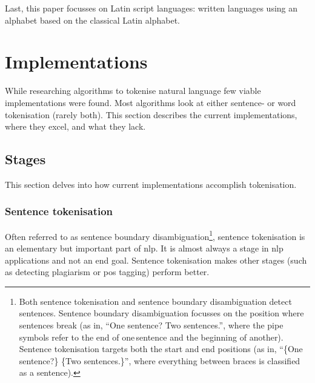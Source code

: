 Last, this paper focusses on Latin script languages: written languages
  using an alphabet based on the classical Latin alphabet.

\section{Implementations}\label{implementations}

While researching algorithms to tokenise natural language few viable
  implementations were found.
Most algorithms look at either sentence- or word tokenisation (rarely both).
This section describes the current implementations, where they excel, and
  what they lack.

\subsection{Stages}\label{stages}

This section delves into how current implementations accomplish tokenisation.

\subsubsection{Sentence tokenisation}\label{sentence-tokenisation}

Often referred to as sentence boundary disambiguation\footnote{Both
    sentence tokenisation and sentence boundary disambiguation detect
      sentences.
    Sentence boundary disambiguation focusses on the position where
      sentences break (as in, ``One sentence?\textbar{} Two
      sentences.\textbar{}'', where the pipe symbols refer to the end of
      one\,sentence and the beginning of another). Sentence
      tokenisation targets both the start and end positions (as in,
      ``\{One sentence?\} \{Two sentences.\}'', where everything between
      braces is classified as a sentence).}, sentence
  tokenisation is an elementary but important part of \gls{nlp}.
It is almost always a stage in \gls{nlp} applications and not an end goal.
Sentence tokenisation makes other stages (such as detecting plagiarism or
  \gls{pos} tagging) perform better.

